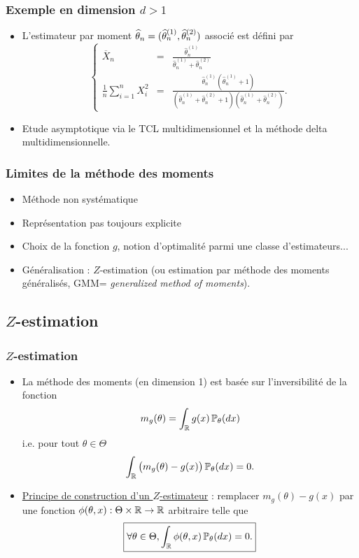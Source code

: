 \begin{frame}
\frametitle{Exemple en dimension $d>1$}
\begin{itemize}
\item \alert{L'estimateur par moment} $\operatorname{\widehat \theta_{\mathnormal{n}}} = (\widehat \theta_n^{(1)},\widehat \theta_n^{(2)})$ associé est défini par
$$
\left\{\begin{array}{cll}
\overline{X}_n & = &\displaystyle \frac{\widehat \theta_n^{(1)}}{\widehat \theta_n^{(1)}+\widehat \theta_n^{(2)}} \\
\frac{1}{n}\sum_{i = 1}^n X_i^2 & = &\displaystyle  \frac{\widehat \theta_n^{(1)}(\widehat \theta_n^{(1)}+1)}{(\widehat \theta_n^{(1)}+\widehat \theta_n^{(2)}+1)(\widehat \theta_n^{(1)}+\widehat \theta_n^{(2)})}.
\end{array}
\right.
$$
\item \alert{Etude asymptotique} via le TCL multidimensionnel et la méthode \og delta\fg{} multidimensionnelle.
\end{itemize}
\end{frame}

\begin{frame}
\frametitle{Limites de la méthode des moments}
\begin{itemize}
\item Méthode \alert{non systématique}
\item Représentation pas toujours explicite
\item Choix de la fonction $g$, notion d'optimalité parmi une classe d'estimateurs...
\item \alert{Généralisation} : $Z$-estimation (ou estimation par méthode
des moments généralisés, GMM= {\it generalized method of moments}).
\end{itemize}
\end{frame}
\subsection{$Z$-estimation}
\begin{frame}
\frametitle{$Z$-estimation}
\begin{itemize}
\item La méthode des moments  (en dimension 1) est basée sur l'inversibilité de la fonction
$$m_g(\theta) = \int_{\operatorname{{\mathbb R}}} g(x)\operatorname{{\mathbb P}}_\theta(dx)$$
i.e. pour tout $\theta \in \Theta$
$$\int_{\operatorname{{\mathbb R}}}\big(m_g(\theta)-g(x)\big)\operatorname{{\mathbb P}}_\theta(dx)=0.$$
\item \underline{Principe de construction d'un $Z$-estimateur} :
\alert{ remplacer} $m_g(\theta)-g(x)$ par une fonction $\phi(\theta,x):
\Theta \times \operatorname{{\mathbb R}} \rightarrow \operatorname{{\mathbb R}}$ \alert{arbitraire}
telle que
$$\boxed{\forall \theta \in \Theta,\int_{\operatorname{{\mathbb R}}}\phi(\theta, x) \operatorname{{\mathbb P}}_\theta(dx)=0.}$$
\end{itemize}
\end{frame}

